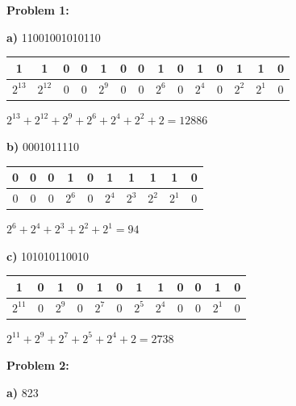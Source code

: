 \documentclass{article}
\begin{document}
    \newpage
    \textbf{Problem 1:}

    \quad \textbf{a)} 11001001010110

    \begin{center}
        \begin{tabular}{ c|c|c|c|c|c|c|c|c|c|c|c|c|c }
            1 & 1 & 0 & 0 & 1 & 0 & 0 & 1 & 0 & 1 & 0 & 1 & 1 & 0 \\
            \hline
            $2^{13}$ & $2^{12}$ & 0 & 0 & $2^9$ & 0 & 0 & $2^6$ & 0 & $2^4$ & 0 & $2^2$ & $2^1$ & 0
        \end{tabular}
    \end{center}

    \quad\quad $2^{13} + 2^{12} + 2^9 + 2^6 + 2^4 + 2^2 + 2 = \boxed{12886}$

    \quad \textbf{b)} 0001011110

    \begin{center}
        \begin{tabular}{ c|c|c|c|c|c|c|c|c|c }
            0 & 0 & 0 & 1 & 0 & 1 & 1 & 1 & 1 & 0 \\
            \hline
            0 & 0 & 0 & $2^6$ & 0 & $2^4$ & $2^3$ & $2^2$ & $2^1$ & 0
        \end{tabular}
    \end{center}

    \quad\quad $2^6 + 2^4 + 2^3 + 2^2 + 2^1 = \boxed{94}$

    \quad \textbf{c)} 101010110010

    \begin{center}
        \begin{tabular}{ c|c|c|c|c|c|c|c|c|c|c|c }
            1 & 0 & 1 & 0 & 1 & 0 & 1 & 1 & 0 & 0 & 1 & 0\\
            \hline
            $2^{11}$ & 0 & $2^9$ & 0 & $2^7$ & 0 & $2^5$ & $2^4$ & 0 & 0 & $2^1$ & 0
        \end{tabular}
    \end{center}

    \quad\quad $2^{11} + 2^9 + 2^7 + 2^5 + 2^4 + 2 = \boxed{2738}$

    \textbf{Problem 2:}

    \quad \textbf{a)} 823
\end{document}
